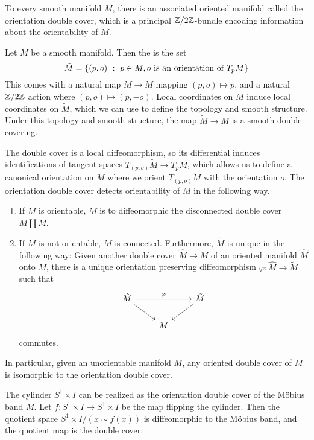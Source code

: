 %
To every smooth manifold $M$, there is an associated oriented manifold called the
orientation double cover, which is a principal $\mathbb{Z}/2\mathbb{Z}$-bundle encoding
information about the orientability of $M$.
%
\begin{defn}
Let $M$ be a smooth manifold. Then the  is the set
\[
\tilde{M} = \left\lbrace (p, o) ~:~ p \in M, o \text{ is an orientation of } T_pM \right\rbrace
\]
This comes with a natural map $\tilde{M} \to M$ mapping $(p,o) \mapsto p$,
and a natural $\mathbb{Z}/2\mathbb{Z}$ action where $(p,o) \mapsto (p,-o)$. Local coordinates
on $M$ induce local coordinates on $\tilde{M}$, which we can use to define the
topology and smooth structure. Under this topology and smooth structure, the
map $\tilde{M} \to M$ is a smooth double covering.
\end{defn}
%
The double cover is a local diffeomorphism, so its differential induces
identifications of tangent spaces $T_{(p,o)}\tilde{M} \to T_pM$, which allows
us to define a canonical orientation on $\tilde{M}$ where we orient
$T_{(p,o)}\tilde{M}$ with the orientation $o$. The orientation double cover
detects orientability of $M$ in the following way.
%
\begin{thm} \enumbreak
\begin{enumerate}
  \item If $M$ is orientable, $\tilde{M}$ is to diffeomorphic the disconnected
  double cover $M \coprod M$.
  \item If $M$ is not orientable, $\tilde{M}$ is connected. Furthermore,
  $\tilde{M}$ is unique in the following way: Given another double cover
  $\hat{M} \to M$ of an oriented manifold $\hat{M}$ onto $M$, there is a unique
  orientation preserving diffeomorphism $\varphi : \hat{M} \to \tilde{M}$ such
  that
  \[\begin{tikzcd}
  \hat{M} \ar[dr]\ar[rr, "\varphi"] && \tilde{M}\ar[dl] \\
   & M
  \end{tikzcd}\]
  commutes.
\end{enumerate}
\end{thm}
%
In particular, given an unorientable manifold $M$, any oriented double
cover of $M$ is isomorphic to the orientation double cover.
%
\begin{exmp}
The cylinder $S^1 \times I$ can be realized as the orientation double
cover of the M\"obius band $M$. Let $f : S^1 \times I \to S^1 \times I$ be the
map flipping the cylinder. Then the quotient space $S^1 \times I / (x \sim f(x))$
is diffeomorphic to the M\"obius band, and the quotient map is the double cover.
\end{exmp}
